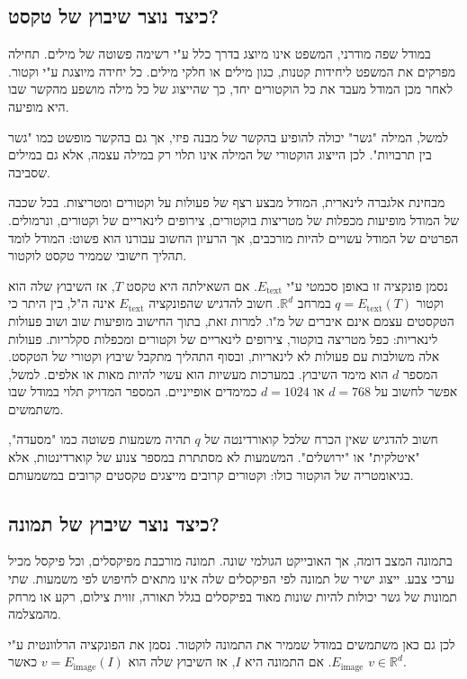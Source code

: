 \documentclass[12pt]{report}
\theoremstyle{plain}
\theoremstyle{definition}
\newcommand{\R}{\mathbb{R}}
\newcommand{\0}{\mathbf{0}}
\begin{document}
\subsection*{כיצד נוצר שיבוץ של טקסט?}

במודל שפה מודרני, המשפט אינו מיוצג בדרך כלל ע"י רשימה פשוטה של מילים.
תחילה מפרקים את המשפט ליחידות קטנות, כגון מילים או חלקי מילים. כל יחידה מיוצגת ע"י וקטור. לאחר מכן המודל מעבד את כל הוקטורים יחד, כך שהייצוג של כל מילה מושפע מהקשר שבו היא מופיעה.

למשל, המילה "גשר" יכולה להופיע בהקשר של מבנה פיזי, אך גם בהקשר מופשט כמו "גשר בין תרבויות".
לכן הייצוג הוקטורי של המילה אינו תלוי רק במילה עצמה, אלא גם במילים שסביבה.

מבחינת אלגברה לינארית, המודל מבצע רצף של פעולות על וקטורים ומטריצות.
בכל שכבה של המודל מופיעות מכפלות של מטריצות בוקטורים, צירופים לינאריים של וקטורים, ונרמולים.
הפרטים של המודל עשויים להיות מורכבים, אך הרעיון החשוב עבורנו הוא פשוט:
המודל לומד תהליך חישובי שממיר טקסט לוקטור.

נסמן פונקציה זו באופן סכמטי ע"י
$E_{\text{text}}$.
אם השאילתה היא טקסט
$T$,
אז השיבוץ שלה הוא וקטור
$q=E_{\text{text}}(T)$
במרחב
$\R^d$.
חשוב להדגיש שהפונקציה
$E_{\text{text}}$
אינה ה"ל, בין היתר כי הטקסטים עצמם אינם איברים של מ"ו.
למרות זאת, בתוך החישוב מופיעות שוב ושוב פעולות לינאריות: כפל מטריצה בוקטור, צירופים לינאריים של וקטורים ומכפלות סקלריות. פעולות אלה משולבות עם פעולות לא לינאריות, ובסוף התהליך מתקבל שיבוץ וקטורי של הטקסט. המספר
$d$
הוא מימד השיבוץ. במערכות מעשיות הוא עשוי להיות מאות או אלפים.
למשל, אפשר לחשוב על
$d=768$
או
$d=1024$
כמימדים אופייניים. המספר המדויק תלוי במודל שבו משתמשים.

חשוב להדגיש שאין הכרח שלכל קואורדינטה של
$q$
תהיה משמעות פשוטה כמו "מסעדה", "איטלקית" או "ירושלים". המשמעות לא מסתתרת במספר צנוע של קוארדינטות, אלא בגיאומטריה של הוקטור כולו: וקטורים קרובים מייצגים טקסטים קרובים במשמעותם.

\subsection*{כיצד נוצר שיבוץ של תמונה?}

בתמונה המצב דומה, אך האובייקט הגולמי שונה. תמונה מורכבת מפיקסלים, וכל פיקסל מכיל ערכי צבע.
ייצוג ישיר של תמונה לפי הפיקסלים שלה אינו מתאים לחיפוש לפי משמעות. שתי תמונות של גשר יכולות להיות שונות מאוד בפיקסלים בגלל תאורה, זווית צילום, רקע או מרחק מהמצלמה.

לכן גם כאן משתמשים במודל שממיר את התמונה לוקטור.
נסמן את הפונקציה הרלוונטית ע"י
$E_{\text{image}}$.
אם התמונה היא
$I$,
אז השיבוץ שלה הוא
$v=E_{\text{image}}(I)$
כאשר
$v\in\mathbb{R}^d$.
\end{document}
